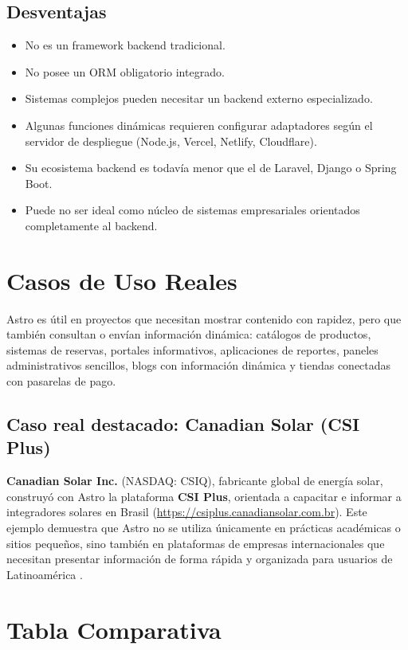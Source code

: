 \documentclass[12pt]{article}
\begin{document}
\subsection{Desventajas}

\begin{itemize}[leftmargin=*]
  \item No es un framework backend tradicional.
  \item No posee un ORM obligatorio integrado.
  \item Sistemas complejos pueden necesitar un backend externo especializado.
  \item Algunas funciones dinámicas requieren configurar adaptadores según el servidor de despliegue (Node.js, Vercel, Netlify, Cloudflare).
  \item Su ecosistema backend es todavía menor que el de Laravel, Django o Spring Boot.
  \item Puede no ser ideal como núcleo de sistemas empresariales orientados completamente al backend.
\end{itemize}

\section{Casos de Uso Reales}

Astro es útil en proyectos que necesitan mostrar contenido con rapidez, pero que también consultan o envían información dinámica: catálogos de productos, sistemas de reservas, portales informativos, aplicaciones de reportes, paneles administrativos sencillos, blogs con información dinámica y tiendas conectadas con pasarelas de pago.

\subsection{Caso real destacado: Canadian Solar (CSI Plus)}

\textbf{Canadian Solar Inc.} (NASDAQ: CSIQ), fabricante global de energía solar, construyó con Astro la plataforma \textbf{CSI Plus}, orientada a capacitar e informar a integradores solares en Brasil (\url{https://csiplus.canadiansolar.com.br}). Este ejemplo demuestra que Astro no se utiliza únicamente en prácticas académicas o sitios pequeños, sino también en plataformas de empresas internacionales que necesitan presentar información de forma rápida y organizada para usuarios de Latinoamérica \parencite{astro_showcase}.

\section{Tabla Comparativa}
\end{document}

